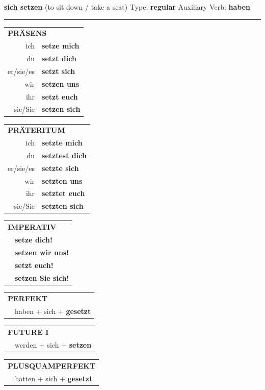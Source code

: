 \documentclass[10pt,a4paper]{revtex4-2}
\begin{document}
\begin{verbbox}
{\Large \bf sich setzen} (to sit down / take a seat) \hfill Type: \textbf{regular} \hfill Auxiliary Verb: \textbf{haben}

\vspace{5pt}
\hrule
\vspace{5pt}

\begin{tabular}{rl}
\multicolumn{2}{l}{\textbf{PRÄSENS}}\\
ich & \textbf{setze mich}\\
du & \textbf{setzt dich}\\
er/sie/es & \textbf{setzt sich}\\
wir & \textbf{setzen uns}\\
ihr & \textbf{setzt euch}\\
sie/Sie & \textbf{setzen sich}\\
\end{tabular}
\hfill
\begin{tabular}{rl}
\multicolumn{2}{l}{\textbf{PRÄTERITUM}}\\
ich & \textbf{setzte mich}\\
du & \textbf{setztest dich}\\
er/sie/es & \textbf{setzte sich}\\
wir & \textbf{setzten uns}\\
ihr & \textbf{setztet euch}\\
sie/Sie & \textbf{setzten sich}\\
\end{tabular}
\hfill
\begin{tabular}{rl}
\multicolumn{2}{l}{\textbf{IMPERATIV}}\\
& \textbf{setze dich!}\\
& \textbf{setzen wir uns!}\\
& \textbf{setzt euch!}\\
& \textbf{setzen Sie sich!}\\
\end{tabular}

\vspace{10pt}

\begin{tabular}{rl}
\multicolumn{2}{l}{\textbf{PERFEKT}}\\
& haben + sich + \textbf{gesetzt}\\
\end{tabular}
\hfill
\begin{tabular}{rl}
\multicolumn{2}{l}{\textbf{FUTURE I}}\\
& werden + sich + \textbf{setzen}\\
\end{tabular}
\hfill
\begin{tabular}{rl}
\multicolumn{2}{l}{\textbf{PLUSQUAMPERFEKT}}\\
& hatten + sich + \textbf{gesetzt}\\
\end{tabular}


\end{verbbox}
\end{document}
